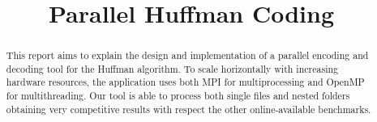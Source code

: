 \documentclass[conference]{IEEEtran}
\begin{document}
\title{Parallel Huffman Coding}

\author{
    \and
}

\maketitle

\thispagestyle{plain}
\pagestyle{plain}

\begin{abstract}
    This report aims to explain the design and implementation of a parallel encoding and decoding tool for the Huffman algorithm.
    To scale horizontally with increasing hardware resources, the application uses both MPI for multiprocessing and OpenMP for multithreading.
    Our tool is able to process both single files and nested folders obtaining very competitive results with respect the other online-available benchmarks.
\end{abstract}







{}



\end{document}
